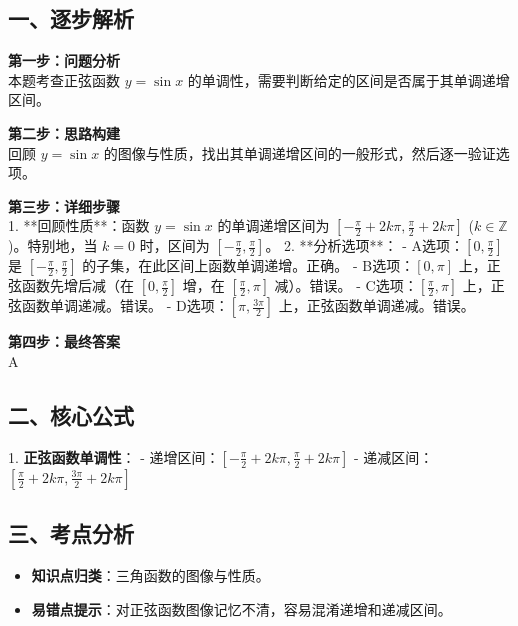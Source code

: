 \documentclass[12pt, a4paper]{ctexart}
\newenvironment{RedAnalysis}{
    \par
    \color{red} %
}{
    \par
    \color{black} %
}
\begin{document}
\begin{RedAnalysis}

\subsection*{一、逐步解析}

\textbf{第一步：问题分析} \\
本题考查正弦函数 $y=\sin x$ 的单调性，需要判断给定的区间是否属于其单调递增区间。

\textbf{第二步：思路构建} \\
回顾 $y=\sin x$ 的图像与性质，找出其单调递增区间的一般形式，然后逐一验证选项。

\textbf{第三步：详细步骤} \\
1. **回顾性质**：函数 $y=\sin x$ 的单调递增区间为 $[-\frac{\pi}{2} + 2k\pi, \frac{\pi}{2} + 2k\pi]$ ($k \in \mathbb{Z}$)。特别地，当 $k=0$ 时，区间为 $[-\frac{\pi}{2}, \frac{\pi}{2}]$。
2. **分析选项**：
   - A选项：$[0, \frac{\pi}{2}]$ 是 $[-\frac{\pi}{2}, \frac{\pi}{2}]$ 的子集，在此区间上函数单调递增。正确。
   - B选项：$[0, \pi]$ 上，正弦函数先增后减（在 $[0, \frac{\pi}{2}]$ 增，在 $[\frac{\pi}{2}, \pi]$ 减）。错误。
   - C选项：$[\frac{\pi}{2}, \pi]$ 上，正弦函数单调递减。错误。
   - D选项：$[\pi, \frac{3\pi}{2}]$ 上，正弦函数单调递减。错误。

\textbf{第四步：最终答案} \\
A

\subsection*{二、核心公式}
1. \textbf{正弦函数单调性}：
   - 递增区间：$[-\frac{\pi}{2} + 2k\pi, \frac{\pi}{2} + 2k\pi]$
   - 递减区间：$[\frac{\pi}{2} + 2k\pi, \frac{3\pi}{2} + 2k\pi]$

\subsection*{三、考点分析}
\begin{itemize}
    \item \textbf{知识点归类}：三角函数的图像与性质。
    \item \textbf{易错点提示}：对正弦函数图像记忆不清，容易混淆递增和递减区间。
\end{itemize}

\end{RedAnalysis}

\vspace{2em}
\end{document}
